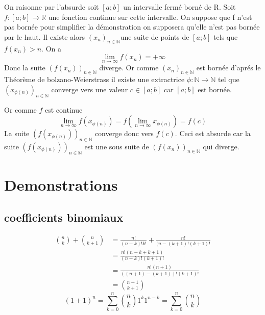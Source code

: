 \documentclass[a4paper,10pt]{article}
\begin{document}
On raisonne par l'absurde soit  $[a; b]$ un intervalle fermé borné de R. Soit $f \colon [a;b] \longrightarrow \mathbb{R}$ une fonction continue sur cette intervalle.
On suppose que f n'est pas bornée pour simplifier la démonstration on supposera qu'elle n'est pas bornée par le haut. 
Il existe alors $(x_{n})_{n \in \mathbb{N}}$une suite de points de $[a; b]$ tels que $f(x_{n}) > n$. 
On a \[\lim_{n \to \infty} f(x_{n}) = +\infty\]
Donc la suite $(f(x_{n}))_{n \in \mathbb{N}}$ diverge.
Or comme $(x_{n})_{n \in \mathbb{N}}$ est bornée d'aprés le Théorème de bolzano-Weierstrass il existe une
extractrice $\phi \colon \mathbb{N} \longrightarrow \mathbb{N}$ tel que $(x_{\phi(n)})_{n \in \mathbb{N}}$ converge vers une valeur $c \in [a; b]$ car 
$[a;b]$ est bornée.

Or comme $f$ est continue \[\lim_{n \to \infty} f(x_{\phi(n)}) = f(\lim_{n \to \infty} x_{\phi(n)}) = f(c)\]
La suite $(f(x_{\phi(n)}))_{n \in \mathbb{N}}$ converge donc vers $f(c)$. Ceci est absurde car la suite $(f(x_{\phi(n)}))_{n \in \mathbb{N}}$ est
une sous suite de $(f(x_{n}))_{n \in \mathbb{N}}$ qui diverge.
\appendix
\section{Demonstrations}
\subsection{coefficients binomiaux}
\begin{align*}
 \textstyle{n \choose k} + \textstyle{n \choose k + 1} &= \frac{n!}{(n - k)!k!} + \frac{n!}{(n - (k + 1)!(k + 1)!}\\
 &= \frac{n!(n - k + k + 1)}{(n - k)!(k + 1)!}\\
 &= \frac{n!(n + 1)}{((n + 1) - (k + 1))!(k + 1)!}\\
 &= \textstyle{n + 1 \choose k + 1}
\end{align*}
\[(1 + 1)^{n} = \sum_{k = 0}^{n} \textstyle{n \choose k} 1^{k}1^{n - k} = \sum_{k = 0}^{n} \textstyle{n \choose k}\]
\end{document}
